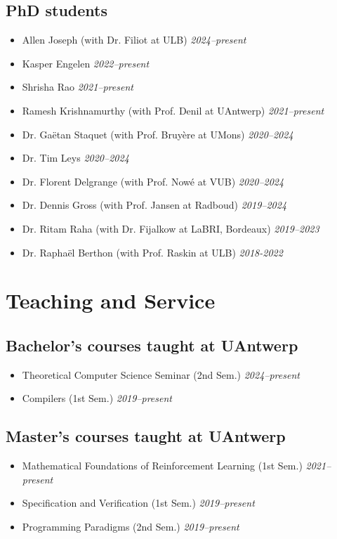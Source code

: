 \documentclass[10pt,a4paper]{moderncv}
\begin{document}
\subsection{PhD students}
\begin{itemize}
  \item Allen Joseph (with Dr. Filiot at ULB) \hfill \textit{2024--present}
  \item Kasper Engelen \hfill \textit{2022--present}
  \item Shrisha Rao \hfill \textit{2021--present}
  \item Ramesh Krishnamurthy (with Prof. Denil at UAntwerp) \hfill \textit{2021--present}
  \item Dr. Ga\"etan Staquet (with Prof. Bruy\`ere at UMons) \hfill
    \textit{2020--2024}
  \item Dr. Tim Leys \hfill \textit{2020--2024}
  \item Dr. Florent Delgrange (with Prof. Now\'e at VUB) \hfill
    \textit{2020--2024}
  \item Dr. Dennis Gross (with Prof. Jansen at Radboud) \hfill
    \textit{2019--2024} 
  \item Dr. Ritam Raha (with Dr. Fijalkow at LaBRI, Bordeaux) \hfill
    \textit{2019--2023}
  \item Dr. Rapha\"el Berthon (with Prof. Raskin at ULB) \hfill
    \textit{2018-2022}
\end{itemize}

\section{Teaching and Service}
\subsection{Bachelor's courses taught at UAntwerp}
\begin{itemize}
  \item Theoretical Computer Science Seminar (2nd Sem.) \hfill
    \textit{2024--present}
  \item Compilers (1st Sem.) \hfill \textit{2019--present}
\end{itemize}

\subsection{Master's courses taught at UAntwerp}
\begin{itemize}
  \item Mathematical Foundations of Reinforcement Learning (1st Sem.) \hfill \textit{2021--present}
  \item Specification and Verification (1st Sem.) \hfill \textit{2019--present}
  \item Programming Paradigms (2nd Sem.) \hfill \textit{2019--present}
\end{itemize}
\end{document}
